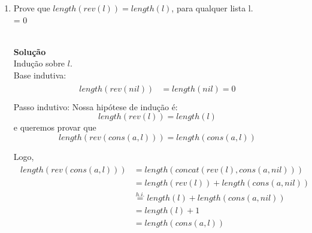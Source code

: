 \documentclass[a4paper]{article}
\newcommand{\answer}[2]{\ifnum#1= 0  {\color{blue} #2}\else \fi}
\begin{document}
\begin{enumerate}
{  }
  
\item Prove que $length(rev(l)) = length(l)$, para qualquer lista l.\\
  \answer{0}{\\ 
    {\bf Solução} \\
    Indução sobre $l$.\\
    Base indutiva:
    \begin{align*}
      \begin{split}
        length(rev(nil)) &= length(nil) = 0\\
      \end{split}
    \end{align*}
    Passo indutivo: Nossa hipótese de indução é: 
    $$length(rev(l)) = length(l)$$
    e queremos provar que
    $$length(rev(cons(a,l))) = length(cons(a,l))$$
    
    Logo,
    \begin{align*}
      \begin{split}
        length(rev(cons(a,l))) &= length(concat(rev(l),cons(a,nil)))\\
        &= length(rev(l)) + length(cons(a,nil))\\
        &\stackrel{h.i.}{=} length(l) + length(cons(a,nil))\\
        &= length(l) + 1\\
        &= length(cons(a,l))
      \end{split}
    \end{align*}
    
  }
  

\end{enumerate}
\end{document}
